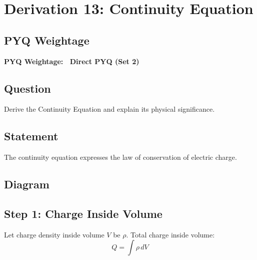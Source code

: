\documentclass[11pt,a4paper]{article}
\begin{document}

\section{Derivation 13: Continuity Equation}

\subsection*{PYQ Weightage}
\begin{tcolorbox}[colback=yellow!10!white, colframe=orange, halign=center]
    \textbf{PYQ Weightage: \textasteriskcentered\textasteriskcentered\textasteriskcentered\textasteriskcentered\textasteriskcentered\ Direct PYQ (Set 2)}
\end{tcolorbox}

\subsection*{Question}
Derive the Continuity Equation and explain its physical significance.

\subsection*{Statement}
The continuity equation expresses the law of conservation of electric charge.

\subsection*{Diagram}
\begin{center}
\end{center}

\subsection*{Step 1: Charge Inside Volume}
Let charge density inside volume \( V \) be \( \rho \).
Total charge inside volume:
\[ Q = \int \rho \, dV \]
\end{document}
